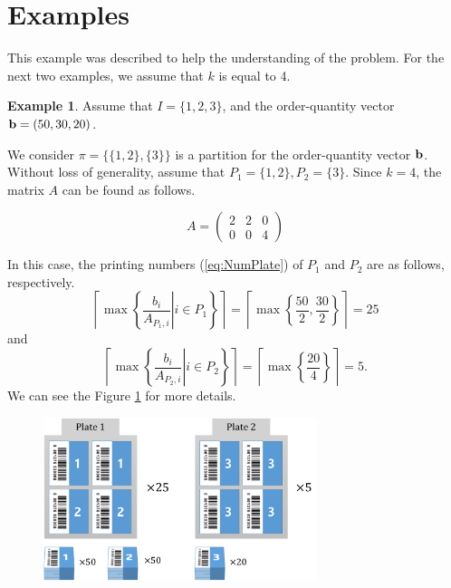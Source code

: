 \documentclass[a4paper]{amsart}
\numberwithin{equation}{section} %
\numberwithin{figure}{section} %
\numberwithin{table}{section}
\theoremstyle{plain}
\theoremstyle{definition}
\newtheorem{example}[thm]{Example}
\theoremstyle{plain}
\theoremstyle{plain}
\theoremstyle{plain}
\theoremstyle{plain}
\theoremstyle{plain}
\begin{document}
\section{Examples}\label{sec:Exam}
This example was described to help the understanding of the problem. For the next two examples, we assume that $k$ is equal to 4.

\begin{example}
	Assume that $I=\{1,2,3\}$, and the order-quantity vector ${\bf b}=(50,30,20)$.
	
	We consider $\pi = \{\{1,2\}, \{3\}\}$ is a partition for the order-quantity vector ${\bf b}$. 
	Without loss of generality, assume that $P_{1} = \{1,2\}, P_{2} = \{3\}$. Since $k = 4$, the matrix $A$ can be found as follows.
	
	\begin{equation}
		A = \left(\begin{array}{ccc}2 & 2 & 0 \\ 0 & 0 & 4 \end{array}\right)
	\end{equation}
	
	In this case, the printing numbers (\ref{eq:NumPlate}) of $P_1$ and $P_2$ are as follows, respectively.
	\begin{equation}
		\left\lceil \max\left\{ \left. \frac{b_{i}}{A_{P_{1},i}} \right| i \in P_{1} \right\} \right\rceil = \left\lceil \max \left\{ \frac{50}{2}, \frac{30}{2} \right\} \right\rceil = 25
	\end{equation}
	and
	\begin{equation}
	\left\lceil \max\left\{ \left. \frac{b_{i}}{A_{P_{2},i}} \right| i \in P_{2} \right\} \right\rceil = \left\lceil \max \left\{ \frac{20}{4} \right\} \right\rceil = 5.
	\end{equation}
	We can see the Figure \ref{fig:ex11} for more details.
	
	\begin{figure}[h!]
		\centering
		\includegraphics[width=8cm]{ex11.pdf}
		\caption{}
		\label{fig:ex11}       %
	\end{figure}
	

\end{example}
\end{document}
